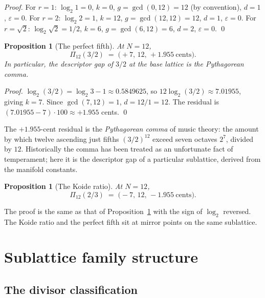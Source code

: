 \documentclass[11pt,a4paper]{article}
\newtheorem{proposition}[theorem]{Proposition}
\theoremstyle{definition}
\theoremstyle{remark}
\newcommand{\eps}{\varepsilon}
\begin{document}
\begin{proof}
For $r=1$: $\log_{2}1 = 0$, $k=0$, $g=\gcd(0,12)=12$ (by convention), $d=1$, $\eps=0$. For $r=2$: $\log_{2}2 = 1$, $k=12$, $g=\gcd(12,12)=12$, $d=1$, $\eps=0$. For $r=\sqrt{2}$: $\log_{2}\sqrt{2}=1/2$, $k=6$, $g=\gcd(6,12)=6$, $d=2$, $\eps=0$. \qed
\end{proof}

\begin{proposition}[The perfect fifth]\label{prop:fifth}
At $N=12$,
\[
\Pi_{12}(3/2) \;=\; \bigl(+7,\,12,\,+1.955\ \text{cents}\bigr).
\]
In particular, the descriptor gap of $3/2$ at the base lattice is the Pythagorean comma.
\end{proposition}

\begin{proof}
$\log_{2}(3/2) = \log_{2}3 - 1 \approx 0.5849625$, so $12\log_{2}(3/2) \approx 7.01955$, giving $k=7$. Since $\gcd(7,12)=1$, $d=12/1=12$. The residual is $(7.01955 - 7)\cdot 100 \approx +1.955$ cents. \qed
\end{proof}

The $+1.955$-cent residual is the \emph{Pythagorean comma} of music theory: the amount by which twelve ascending just fifths $(3/2)^{12}$ exceed seven octaves $2^{7}$, divided by $12$. Historically the comma has been treated as an unfortunate fact of temperament; here it is the descriptor gap of a particular sublattice, derived from the manifold constants.

\begin{proposition}[The Koide ratio]\label{prop:koide}
At $N=12$,
\[
\Pi_{12}(2/3) \;=\; \bigl(-7,\,12,\,-1.955\ \text{cents}\bigr).
\]
\end{proposition}

The proof is the same as that of Proposition~\ref{prop:fifth} with the sign of $\log_{2}$ reversed. The Koide ratio and the perfect fifth sit at mirror points on the same sublattice.

\section{Sublattice family structure}\label{sec:sublattice}

\subsection{The divisor classification}
\end{document}
